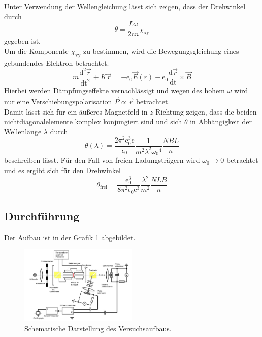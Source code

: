   Unter Verwendung der Wellengleichung lässt sich zeigen, dass der Drehwinkel durch
  \begin{equation}
    \theta=\frac{L\omega}{2\text{c}n}\chi_{\text{xy}}
  \end{equation}
  gegeben ist.\\
  Um die Komponente $\chi_{\text{xy}}$ zu bestimmen, wird die Bewegungsgleichung
  eines gebundendes Elektron betrachtet.
  \begin{equation}
    m\frac{\text{d}^2 \vec{r}}{\text{dt}^2}+K\vec{r}= -\text{e}_0
    \vec{E}(r)-\text{e}_0\frac{\text{d}\vec{r}}{\text{dt}}\times \vec{B}
    \end{equation}
  Hierbei werden Dämpfungseffekte vernachlässigt und wegen des hohem $\omega$ wird nur eine
  Verschiebungspolarisation $\vec{P} \propto \vec{r}$ betrachtet.\\
  Damit lässt sich für ein äußeres Magnetfeld in $z$-Richtung zeigen, dass
  die beiden nichtdiagonalelemente komplex konjungiert sind und sich $\theta$ in Abhängigkeit der
  Wellenlänge $\lambda$ durch
  \begin{equation}
    \theta(\lambda)=\frac{2\pi^2 \text{e}_0^3 \text{c}}{\epsilon_0}\frac{1}{m^2 \lambda^2 \omega{_0}^4}\frac{N B L}{n}
    \label{eq:WinkelLambda}
  \end{equation}
      beschreiben lässt.
  Für den Fall von freien Ladungsträgern wird $\omega_0 \rightarrow 0$ betrachtet und es ergibt sich für den Drehwinkel
\begin{equation}
  \theta_{\text{frei}}=\frac{\text{e}_0^3}{8 \pi^2 \epsilon_0 \text{c}^3}\frac{\lambda^2}{m^2}\frac{N L B}{n}
  \label{eq:Winkelfrei}
\end{equation}
\subsection{Durchführung}
Der Aufbau ist in der Grafik \ref{fig:Aufbau} abgebildet.
\begin{figure}[H]
\center
\includegraphics[width=0.5\textwidth]{pics/Aufbau.jpg}
\caption{Schematische Darstellung des Versuchsaufbaus.\cite{1}}  %
\label{fig:Aufbau}
\end{figure}
